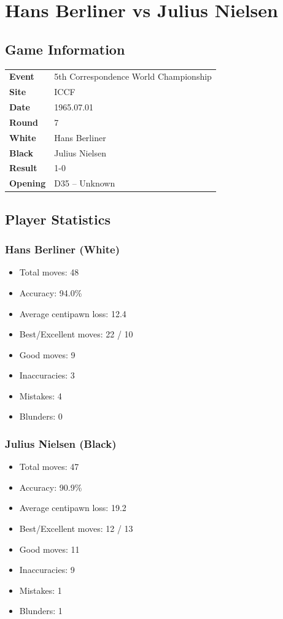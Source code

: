 \documentclass[11pt]{book}
\begin{document}
\chapter{Hans Berliner vs Julius Nielsen}

\section{Game Information}
\begin{tabular}{ll}
\textbf{Event} & 5th Correspondence World Championship \\
\textbf{Site} & ICCF \\
\textbf{Date} & 1965.07.01 \\
\textbf{Round} & 7 \\
\textbf{White} & Hans Berliner \\
\textbf{Black} & Julius Nielsen \\
\textbf{Result} & 1-0 \\
\textbf{Opening} & D35 -- Unknown \\
\end{tabular}

\section{Player Statistics}

\subsection{Hans Berliner (White)}
\begin{itemize}
\item Total moves: 48
\item Accuracy: 94.0\%
\item Average centipawn loss: 12.4
\item Best/Excellent moves: 22 / 10
\item Good moves: 9
\item Inaccuracies: 3
\item Mistakes: 4
\item Blunders: 0
\end{itemize}

\subsection{Julius Nielsen (Black)}
\begin{itemize}
\item Total moves: 47
\item Accuracy: 90.9\%
\item Average centipawn loss: 19.2
\item Best/Excellent moves: 12 / 13
\item Good moves: 11
\item Inaccuracies: 9
\item Mistakes: 1
\item Blunders: 1
\end{itemize}
\end{document}
